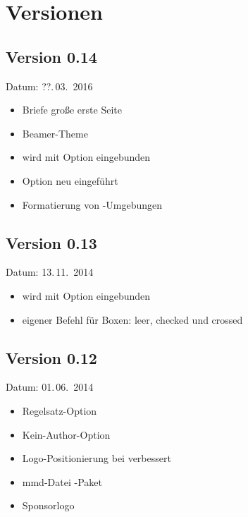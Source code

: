 
\cleardoublepage
\section{Versionen}

\subsection{Version 0.14}

Datum: ??.\,03.~2016

\begin{itemize}
	\item Briefe große erste Seite
	\item Beamer-Theme
	\item {} wird mit Option  eingebunden
	\item Option  neu eingeführt
	\item Formatierung von -Umgebungen
\end{itemize}

\subsection{Version 0.13}

Datum: 13.\,11.~2014

\begin{itemize}
	\item {} wird mit Option  eingebunden
	\item eigener Befehl  für Boxen: leer, checked und crossed
\end{itemize}

\subsection{Version 0.12}

Datum: 01.\,06.~2014

\begin{itemize}
	\item Regelsatz-Option 
	\item Kein-Author-Option 
	\item Logo-Positionierung bei  verbessert
	\item mmd-Datei -Paket
	\item Sponsorlogo
\end{itemize}

